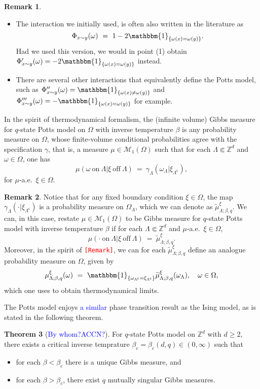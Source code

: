 \documentclass[12pt]{article}
\newcommand{\M}{\mathcal{M}}
\newcommand{\Z}{\mathbb{Z}}
\newcommand{\set}[1]{\left\{#1\right\}}
\newcommand{\pika}{\boldsymbol{\cdot}}
\newcommand{\1}{\mathbbm{1}}
\renewcommand{\c}{\mathsf{c}}
\newcommand{\5}{\vspace{0.5cm}}
\renewcommand{\tilde}{\widetilde}
\theoremstyle{definition}
\newtheorem{thm}{Theorem}[section]
\newtheorem{rem}[thm]{Remark}
\begin{document}
\begin{rem}
\begin{itemize}
	\item[(2)] The interaction we initially used, is often also written in the literature as 
	$$\Phi_{x\sim y}(\omega) ~=~ 1-2\1_{\set{\omega(x)=\omega(y)}}.$$
	Had we used this version, we would in point (1) obtain $\Phi_{x\sim y}'(\omega)=-2\1_{\set{\omega(x)=\omega(y)}}$ instead.
	\item[(3)] There are several other interactions that equivalently define the Potts model, such as $\Phi_{x\sim y}''(\omega)=\1_{\set{\omega(x)\neq\omega(y)}}$ and $\Phi_{x\sim y}'''(\omega)=-\1_{\set{\omega(x)=\omega(y)}}$ for example.
\end{itemize}
\end{rem}

In the spirit of thermodynamical formalism, the (infinite volume) Gibbs measure for $q$-state Potts model on $\Omega$ with inverse temperature $\beta$ is any probability measure on $\Omega$, whose finite-volume conditional probabilities agree with the specification $\gamma$, that is, a measure $\mu\in\M_1(\Omega)$ such that for each $\Lambda\Subset\Z^d$ and $\omega\in\Omega$, one has
$$\mu(\omega~\text{on}~\Lambda|\xi~\text{off}~\Lambda) ~=~ \gamma_\Lambda(\omega_\Lambda|\xi_{\Lambda^\c}),$$
for $\mu$-a.e.~$\xi\in\Omega$.

\begin{rem}
Notice that for any fixed boundary condition $\xi\in\Omega$, the map $\gamma_\Lambda(\pika|\xi_{\Lambda^\c})$ is a probability measure on $\Omega_\Lambda$, which we can denote as $\tilde{\mu}_{\Lambda;\beta,q}^\xi$. We can, in this case, restate $\mu\in\M_1(\Omega)$ to be Gibbs measure for $q$-state Potts model with inverse temperature $\beta$ if for each $\Lambda\Subset\Z^d$ and $\mu$-a.e.~$\xi\in\Omega$, 
$$\mu(\pika~\text{on}~\Lambda|\xi~\text{off}~\Lambda) ~=~ \tilde{\mu}_{\Lambda;\beta,q}^\xi.$$
Moreover, in the spirit of \textcolor{red}{\texttt{[Remark]}}, we can for each $\tilde{\mu}_{\Lambda;\beta,q}^\xi$ define an analogue probability measure on $\Omega$, given by
$$\mu_{\Lambda;\beta,q}^\xi(\omega) ~=~ \1_{\set{\omega_{\Lambda^\c}=\xi_{\Lambda^\c}}}\tilde{\mu}_{\Lambda;\beta,q}^\xi(\omega_\Lambda), \quad \omega\in\Omega,$$
which one uses to obtain thermodynamical limits.
\end{rem}

The Potts model enjoys \textcolor{blue}{a similar} phase transition result as the Ising model, as is stated in the following theorem.

\begin{thm}[\textcolor{blue}{By whom?ACCN?}]
For $q$-state Potts model on $\Z^d$ with $d\geq 2$, there exists a critical inverse temprature $\beta_c=\beta_c(d,q)\in(0,\infty)$ such that
\begin{itemize}
	\item[(i)] for each $\beta<\beta_c$ there is a unique Gibbs measure, and 
	\item[(ii)] for each $\beta>\beta_c$, there exist $q$ mutually singular Gibbs measures.
\end{itemize}
\end{thm}
\end{document}
